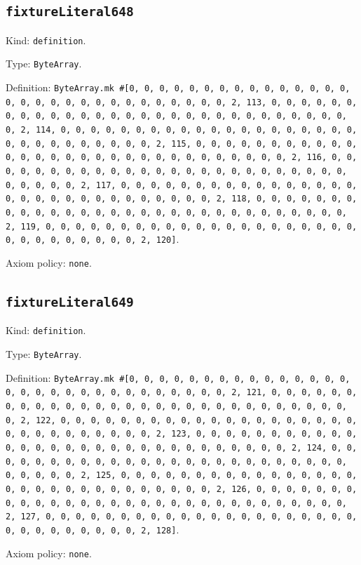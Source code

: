 \documentclass[11pt]{article}
\begin{document}
\subsection*{\texttt{fixtureLiteral648}}
\noindent Kind: \texttt{definition}.\par
\noindent Type: \texttt{ByteArray}.\par
\noindent Definition: \texttt{ByteArray.mk \#[0, 0, 0, 0, 0, 0, 0, 0, 0, 0, 0, 0, 0, 0, 0, 0, 0, 0, 0, 0, 0, 0, 0, 0, 0, 0, 0, 0, 0, 0, 2, 113, 0, 0, 0, 0, 0, 0, 0, 0, 0, 0, 0, 0, 0, 0, 0, 0, 0, 0, 0, 0, 0, 0, 0, 0, 0, 0, 0, 0, 0, 0, 2, 114, 0, 0, 0, 0, 0, 0, 0, 0, 0, 0, 0, 0, 0, 0, 0, 0, 0, 0, 0, 0, 0, 0, 0, 0, 0, 0, 0, 0, 0, 0, 2, 115, 0, 0, 0, 0, 0, 0, 0, 0, 0, 0, 0, 0, 0, 0, 0, 0, 0, 0, 0, 0, 0, 0, 0, 0, 0, 0, 0, 0, 0, 0, 2, 116, 0, 0, 0, 0, 0, 0, 0, 0, 0, 0, 0, 0, 0, 0, 0, 0, 0, 0, 0, 0, 0, 0, 0, 0, 0, 0, 0, 0, 0, 0, 2, 117, 0, 0, 0, 0, 0, 0, 0, 0, 0, 0, 0, 0, 0, 0, 0, 0, 0, 0, 0, 0, 0, 0, 0, 0, 0, 0, 0, 0, 0, 0, 2, 118, 0, 0, 0, 0, 0, 0, 0, 0, 0, 0, 0, 0, 0, 0, 0, 0, 0, 0, 0, 0, 0, 0, 0, 0, 0, 0, 0, 0, 0, 0, 2, 119, 0, 0, 0, 0, 0, 0, 0, 0, 0, 0, 0, 0, 0, 0, 0, 0, 0, 0, 0, 0, 0, 0, 0, 0, 0, 0, 0, 0, 0, 0, 2, 120]}.\par
\noindent Axiom policy: \texttt{none}.\par
\subsection*{\texttt{fixtureLiteral649}}
\noindent Kind: \texttt{definition}.\par
\noindent Type: \texttt{ByteArray}.\par
\noindent Definition: \texttt{ByteArray.mk \#[0, 0, 0, 0, 0, 0, 0, 0, 0, 0, 0, 0, 0, 0, 0, 0, 0, 0, 0, 0, 0, 0, 0, 0, 0, 0, 0, 0, 0, 0, 2, 121, 0, 0, 0, 0, 0, 0, 0, 0, 0, 0, 0, 0, 0, 0, 0, 0, 0, 0, 0, 0, 0, 0, 0, 0, 0, 0, 0, 0, 0, 0, 2, 122, 0, 0, 0, 0, 0, 0, 0, 0, 0, 0, 0, 0, 0, 0, 0, 0, 0, 0, 0, 0, 0, 0, 0, 0, 0, 0, 0, 0, 0, 0, 2, 123, 0, 0, 0, 0, 0, 0, 0, 0, 0, 0, 0, 0, 0, 0, 0, 0, 0, 0, 0, 0, 0, 0, 0, 0, 0, 0, 0, 0, 0, 0, 2, 124, 0, 0, 0, 0, 0, 0, 0, 0, 0, 0, 0, 0, 0, 0, 0, 0, 0, 0, 0, 0, 0, 0, 0, 0, 0, 0, 0, 0, 0, 0, 2, 125, 0, 0, 0, 0, 0, 0, 0, 0, 0, 0, 0, 0, 0, 0, 0, 0, 0, 0, 0, 0, 0, 0, 0, 0, 0, 0, 0, 0, 0, 0, 2, 126, 0, 0, 0, 0, 0, 0, 0, 0, 0, 0, 0, 0, 0, 0, 0, 0, 0, 0, 0, 0, 0, 0, 0, 0, 0, 0, 0, 0, 0, 0, 2, 127, 0, 0, 0, 0, 0, 0, 0, 0, 0, 0, 0, 0, 0, 0, 0, 0, 0, 0, 0, 0, 0, 0, 0, 0, 0, 0, 0, 0, 0, 0, 2, 128]}.\par
\noindent Axiom policy: \texttt{none}.\par
\end{document}
